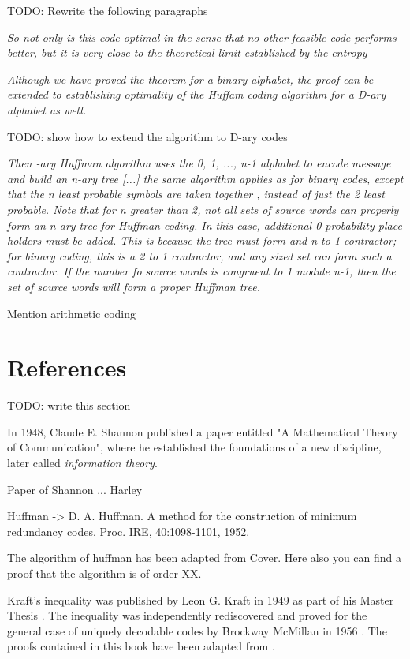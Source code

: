 {\color{red} TODO: Rewrite the following paragraphs}

\emph{So not only is this code optimal in the sense that no other feasible code performs better, but it is very close to the theoretical limit established by the entropy}

\emph{Although we have proved the theorem for a binary alphabet, the proof can be extended to establishing optimality of the Huffam coding algorithm for a D-ary alphabet as well.}

{\color{red} TODO: show how to extend the algorithm to D-ary codes}

\emph{Then -ary Huffman algorithm uses the {0, 1, ..., n-1} alphabet to encode message and build an n-ary tree [...] the same algorithm applies as for binary codes, except that the n least probable symbols are taken together , instead of just the 2 least probable. Note that for n greater than 2, not all sets of source words  can properly form an n-ary tree for Huffman coding. In this case, additional 0-probability place holders must be added. This is because the tree must form and n to 1 contractor; for binary coding, this is a 2 to 1 contractor, and any sized set can form such a contractor. If the number fo source words is congruent to 1 module n-1, then the set of source words will form a proper Huffman tree.}

{\color{red} Mention arithmetic coding}


\section*{References}

{\color{red} TODO: write this section}

In 1948, Claude E. Shannon published a paper entitled "A Mathematical Theory of Communication", where he established the foundations of a new discipline, later called \emph{information theory}.

Paper of Shannon ... Harley

Huffman -> D. A. Huffman. A method for the construction of minimum redundancy codes. Proc. IRE, 40:1098-1101, 1952.

The algorithm of huffman has been adapted from Cover. Here also you can find a proof that the algorithm is of order XX. 

Kraft's inequality was published by Leon G. Kraft in 1949 as part of his Master Thesis \cite{kraft1949device}. The inequality was independently rediscovered and proved for the general case of uniquely decodable codes by Brockway McMillan in 1956 \cite{mcmillan1956two}. The proofs contained in this book have been adapted from \cite{cover2012elements}.



